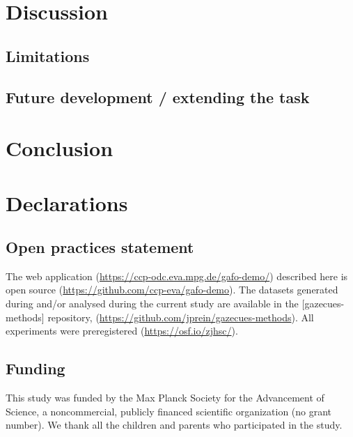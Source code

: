 \documentclass[
  english,
  man,floatsintext]{apa6}
\begin{document}
\hypertarget{discussion-1}{%
\section{Discussion}\label{discussion-1}}

\hypertarget{limitations-1}{%
\subsection{Limitations}\label{limitations-1}}

\hypertarget{future-development-extending-the-task-1}{%
\subsection{Future development / extending the task}\label{future-development-extending-the-task-1}}

\hypertarget{conclusion-1}{%
\section{Conclusion}\label{conclusion-1}}

\hypertarget{declarations}{%
\section{Declarations}\label{declarations}}

\hypertarget{open-practices-statement}{%
\subsection{Open practices statement}\label{open-practices-statement}}

The web application (\url{https://ccp-odc.eva.mpg.de/gafo-demo/}) described here is open source (\url{https://github.com/ccp-eva/gafo-demo}).
The datasets generated during and/or analysed during the current study are available in the {[}gazecues-methods{]} repository, (\url{https://github.com/jprein/gazecues-methods}). All experiments were preregistered (\url{https://osf.io/zjhsc/}).

\hypertarget{funding}{%
\subsection{Funding}\label{funding}}

This study was funded by the Max Planck Society for the Advancement of Science, a noncommercial, publicly financed scientific organization (no grant number). We thank all the children and parents who participated in the study.
\end{document}
